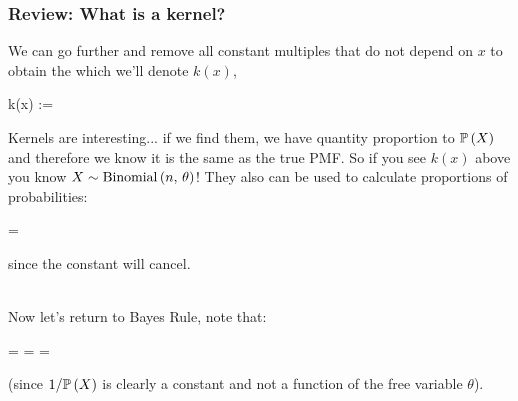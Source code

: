 \documentclass[slides]{beamer} %
\begin{document}
\begin{frame}
	\frametitle{Review: What is a kernel?}

\scriptsize

We can go further and remove all constant multiples that do not depend on $x$ to obtain the  which we'll denote $k(x)$, \pause 

\beqn
k(x) :=  \propto {}
\eeqn\pause 

Kernels are interesting... if we find them, we have quantity proportion to $\mathbb{P}\left(X\right)$ and therefore we know it is the same as the true PMF. \pause So if you see $k(x)$ above you know $X \sim \mathrm{Binomial}\left(n,\,\theta\right)$! \pause They also can be used to calculate proportions of probabilities:

\beqn
{} = 
\eeqn\pause 

since the constant will cancel. \\~\\\pause 

Now let's return to Bayes Rule, note that:

\beqn
{} =  =   \prob{\theta} \propto\pause  {} \prob{\theta} = \pause {} ~\times~ \pause {}
\eeqn\pause 

(since $1/\mathbb{P}\left(X\right)$ is clearly a constant and not a function of the free variable $\theta$).

\end{frame}
\end{document}
